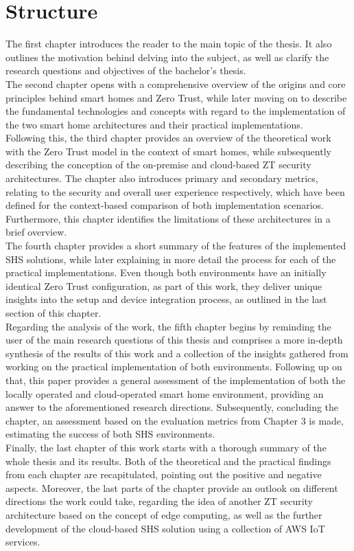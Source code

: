 \section{Structure}
The first chapter introduces the reader to the main topic of the thesis. It also outlines the motivation behind delving into the subject, as well as clarify the research questions and objectives of the bachelor's thesis.\\
The second chapter opens with a comprehensive overview of the origins and core principles behind smart homes and Zero Trust, while later moving on to describe the fundamental technologies and concepts with regard to the implementation of the two smart home architectures and their practical implementations.\\
Following this, the third chapter provides an overview of the theoretical work with the Zero Trust model in the context of smart homes, while subsequently describing the conception of the on-premise and cloud-based ZT security architectures. The chapter also introduces primary and secondary metrics, relating to the security and overall user experience respectively, which have been defined for the context-based comparison of both implementation scenarios. Furthermore, this chapter identifies the limitations of these architectures in a brief overview.\\
The fourth chapter provides a short summary of the features of the implemented SHS solutions, while later explaining in more detail the process for each of the practical implementations. Even though both environments have an initially identical Zero Trust configuration, as part of this work, they deliver unique insights into the setup and device integration process, as outlined in the last section of this chapter.\\
Regarding the analysis of the work, the fifth chapter begins by reminding the user of the main research questions of this thesis and comprises a more in-depth synthesis of the results of this work and a collection of the insights gathered from working on the practical implementation of both environments. Following up on that, this paper provides a general assessment of the implementation of both the locally operated and cloud-operated smart home environment, providing an answer to the aforementioned research directions. Subsequently, concluding the chapter, an assessment based on the evaluation metrics from Chapter 3 is made, estimating the success of both SHS environments.\\
Finally, the last chapter of this work starts with a thorough summary of the whole thesis and its results. Both of the theoretical and the practical findings from each chapter are recapitulated, pointing out the positive and negative aspects. Moreover, the last parts of the chapter provide an outlook on different directions the work could take, regarding the idea of another ZT security architecture based on the concept of edge computing, as well as the further development of the cloud-based SHS solution using a collection of AWS IoT services.